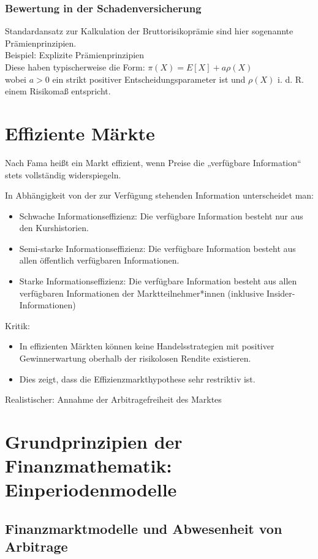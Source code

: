 \documentclass[12pt]{report}
\theoremstyle{dotless}
\theoremstyle{definition}
\begin{document}
\subsubsection{Bewertung in der Schadenversicherung}
Standardansatz zur Kalkulation der Bruttorisikoprämie sind hier sogenannte
Prämienprinzipien.\\
Beispiel: Explizite Prämienprinzipien\\
Diese haben typischerweise die Form: $\pi(X) = E[X] + a\rho(X)$\\
wobei $a >0$ ein strikt positiver Entscheidungsparameter ist und $\rho(X)$ i. d. R. einem Risikomaß entspricht.


\section{Effiziente Märkte}
Nach Fama heißt ein Markt effizient, wenn Preise die „verfügbare
Information“ stets vollständig widerspiegeln.

In Abhängigkeit von der zur Verfügung stehenden Information unterscheidet
man:
\begin{itemize}
\item Schwache Informationseffizienz: Die verfügbare Information besteht nur aus
den Kurshistorien.
\item Semi-starke Informationseffizienz: Die verfügbare Information besteht aus allen
öffentlich verfügbaren Informationen.
\item Starke Informationseffizienz: Die verfügbare Information besteht aus allen
verfügbaren Informationen der Marktteilnehmer*innen (inklusive
Insider-Informationen)
\end{itemize}

Kritik: 
\begin{itemize}
\item In effizienten Märkten können keine Handelsstrategien mit positiver
Gewinnerwartung oberhalb der risikolosen Rendite existieren.
\item Dies zeigt, dass die Effizienzmarkthypothese sehr restriktiv ist.
\end{itemize}
Realistischer: Annahme der Arbitragefreiheit des Marktes



\section{Grundprinzipien der Finanzmathematik: Einperiodenmodelle}


\subsection{Finanzmarktmodelle und Abwesenheit von Arbitrage}
\end{document}

